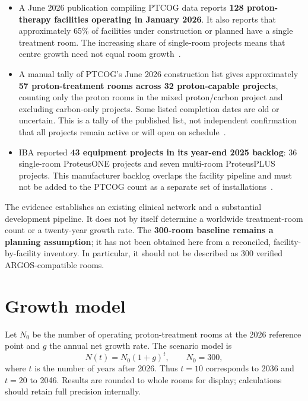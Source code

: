 \documentclass[11pt,a4paper]{article}
\begin{document}
\begin{itemize}
\item A June 2026 publication compiling PTCOG data reports \textbf{128
proton-therapy facilities operating in January 2026}. It also reports that
approximately 65\% of facilities under construction or planned have a single
treatment room. The increasing share of single-room projects means that centre
growth need not equal room growth~\cite{yap2026}.

\item A manual tally of PTCOG's June 2026 construction list gives approximately
\textbf{57 proton-treatment rooms across 32 proton-capable projects}, counting
only the proton rooms in the mixed proton/carbon project and excluding
carbon-only projects. Some listed completion dates are old or uncertain.
This is a tally of the published list, not independent confirmation that all
projects remain active or will open on schedule~\cite{ptcogconstruction}.

\item IBA reported \textbf{43 equipment projects in its year-end 2025 backlog}:
36 single-room ProteusONE projects and seven multi-room ProteusPLUS projects.
This manufacturer backlog overlaps the facility pipeline and must not be added
to the PTCOG count as a separate set of installations~\cite{iba2025}.
\end{itemize}

The evidence establishes an existing clinical network and a substantial
development pipeline. It does not by itself determine a worldwide treatment-room
count or a twenty-year growth rate. The \textbf{300-room baseline remains a
planning assumption}; it has not been obtained here from a reconciled,
facility-by-facility inventory. In particular, it should not be described as
300 verified ARGOS-compatible rooms.

\section{Growth model}

Let $N_0$ be the number of operating proton-treatment rooms at the 2026 reference
point and $g$ the annual net growth rate. The scenario model is
\begin{equation}
N(t)=N_0(1+g)^t,\qquad N_0=300,
\end{equation}
where $t$ is the number of years after 2026. Thus $t=10$ corresponds to 2036 and
$t=20$ to 2046. Results are rounded to whole rooms for display; calculations
should retain full precision internally.
\end{document}
